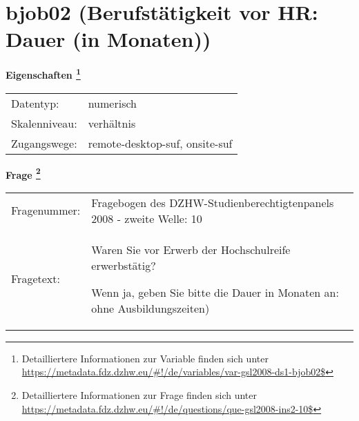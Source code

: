 
    \setcounter{footnote}{0}

    \vspace*{-1.8cm}
	\section{bjob02 (Berufstätigkeit vor HR: Dauer (in Monaten))}
	\label{section:bjob02}



    \vspace*{0.5cm}
    \noindent\textbf{Eigenschaften
	\footnote{Detailliertere Informationen zur Variable finden sich unter
		\url{https://metadata.fdz.dzhw.eu/\#!/de/variables/var-gsl2008-ds1-bjob02$}}}\\
	\begin{tabularx}{\hsize}{@{}lX}
	Datentyp: & numerisch \\
	Skalenniveau: & verhältnis \\
	Zugangswege: &
	  remote-desktop-suf, 
	  onsite-suf
 \\
    \end{tabularx}



				\vspace*{0.5cm}
                \noindent\textbf{Frage
	                \footnote{Detailliertere Informationen zur Frage finden sich unter
		              \url{https://metadata.fdz.dzhw.eu/\#!/de/questions/que-gsl2008-ins2-10$}}}\\
				\begin{tabularx}{\hsize}{@{}lX}
					Fragenummer: &
					  Fragebogen des DZHW-Studienberechtigtenpanels 2008 - zweite Welle:
					  10
 \\
					Fragetext: & Waren Sie vor Erwerb der Hochschulreife erwerbstätig?\par  Wenn ja, geben Sie bitte die Dauer in Monaten an: ohne Ausbildungszeiten) \\
				\end{tabularx}





